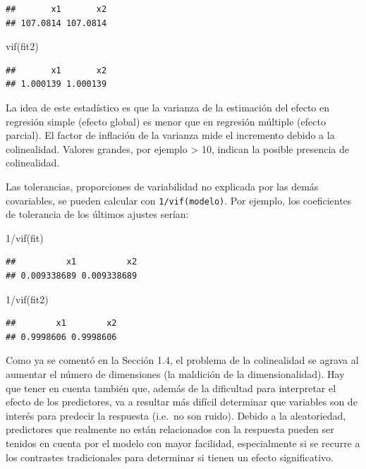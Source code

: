 \documentclass[
  spanish,
]{book}
\newenvironment{Shaded}{\begin{snugshade}}{\end{snugshade}}
\newcommand{\DecValTok}[1]{\textcolor[rgb]{0.00,0.00,0.81}{#1}}
\newcommand{\FunctionTok}[1]{\textcolor[rgb]{0.00,0.00,0.00}{#1}}
\newcommand{\NormalTok}[1]{#1}
\newcommand{\SpecialCharTok}[1]{\textcolor[rgb]{0.00,0.00,0.00}{#1}}
\theoremstyle{break}
\theoremstyle{definition}
\theoremstyle{definition}
\theoremstyle{definition}
\theoremstyle{definition}
\theoremstyle{remark}
\begin{document}
\begin{verbatim}
##       x1       x2 
## 107.0814 107.0814
\end{verbatim}

\begin{Shaded}
\begin{Highlighting}[]
\FunctionTok{vif}\NormalTok{(fit2) }
\end{Highlighting}
\end{Shaded}

\begin{verbatim}
##       x1       x2 
## 1.000139 1.000139
\end{verbatim}

La idea de este estadístico es que la varianza de la estimación del efecto en
regresión simple (efecto global) es menor que en regresión múltiple (efecto parcial).
El factor de inflación de la varianza mide el incremento debido a la colinealidad.
Valores grandes, por ejemplo \textgreater{} 10, indican la posible presencia de colinealidad.

Las tolerancias, proporciones de variabilidad no explicada por las demás covariables, se pueden calcular con \texttt{1/vif(modelo)}.
Por ejemplo, los coeficientes de tolerancia de los últimos ajustes serían:

\begin{Shaded}
\begin{Highlighting}[]
\DecValTok{1}\SpecialCharTok{/}\FunctionTok{vif}\NormalTok{(fit)}
\end{Highlighting}
\end{Shaded}

\begin{verbatim}
##          x1          x2 
## 0.009338689 0.009338689
\end{verbatim}

\begin{Shaded}
\begin{Highlighting}[]
\DecValTok{1}\SpecialCharTok{/}\FunctionTok{vif}\NormalTok{(fit2) }
\end{Highlighting}
\end{Shaded}

\begin{verbatim}
##        x1        x2 
## 0.9998606 0.9998606
\end{verbatim}

Como ya se comentó en la Sección 1.4, el problema de la colinealidad se agrava al aumentar el número de dimensiones (la maldición de la dimensionalidad).
Hay que tener en cuenta también que, además de la dificultad para interpretar el efecto de los predictores, va a resultar más difícil determinar que variables son de interés para predecir la respuesta (i.e.~no son ruido). Debido a la aleatoriedad, predictores que realmente no están relacionados con la respuesta pueden ser tenidos en cuenta por el modelo con mayor facilidad, especialmente si se recurre a los contrastes tradicionales para determinar si tienen un efecto significativo.
\end{document}
